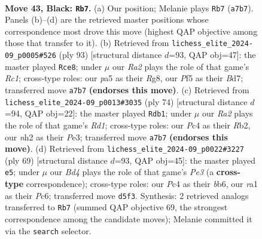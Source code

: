 \documentclass[11pt]{article}
\begin{document}
\clearpage

\begin{figure}[p]\centering
\begin{subfigure}{0.46\textwidth}\centering
\resizebox{\linewidth}{!}{%
\newchessgame
\chessboard[
  setfen={5b1r/r2k2p1/p1p4p/Pp1bBp2/2p4P/4P1P1/1P3P1N/R2K2R1 b - - 3 43},
  showmover=false,
  pgfstyle=straightmove, color=movearrow, markmove={a7-b7}
]}
\caption{}
\end{subfigure}\hfill
\begin{subfigure}{0.46\textwidth}\centering
\resizebox{\linewidth}{!}{%
\newchessgame
\chessboard[
  setfen={2r3r1/2kb1p2/4p1p1/1p1pP2p/pP3P2/P1PR2P1/4B2P/2K1R3 b - - 34 47},
  showmover=false,
  pgfstyle=straightmove, color=movearrow, markmove={c8-e8}
]}
\caption{}
\end{subfigure}
\\[4pt]
\begin{subfigure}{0.46\textwidth}\centering
\resizebox{\linewidth}{!}{%
\newchessgame
\chessboard[
  setfen={3r4/1pr1k2p/p3Bpp1/b2P4/P3p3/4P2P/1R3PP1/3R2K1 w - - 1 38},
  showmover=false,
  pgfstyle=straightmove, color=movearrow, markmove={d1-b1}
]}
\caption{}
\end{subfigure}\hfill
\begin{subfigure}{0.46\textwidth}\centering
\resizebox{\linewidth}{!}{%
\newchessgame
\chessboard[
  setfen={4r1k1/1p3p1p/pBp1p1pb/2P5/3PPP2/6P1/bP1N1K1P/3R4 b - - 1 35},
  showmover=false,
  pgfstyle=straightmove, color=movearrow, markmove={e6-e5}
]}
\caption{}
\end{subfigure}
\caption{\textbf{Move 43, Black: \texttt{Rb7}.} (a) Our position; Melanie plays \texttt{Rb7} (\texttt{a7b7}). Panels (b)--(d) are the retrieved master positions whose correspondence most drove this move (highest QAP objective among those that transfer to it). (b) Retrieved from \texttt{lichess\_elite\_2024-09\_p0005\#526} (ply 93) [structural distance $d$=93, QAP obj=47]: the master played \texttt{Rce8}; under $\mu$ our \emph{Ra2} plays the role of that game's \emph{Rc1}; cross-type roles: our \emph{p}a5 as their \emph{R}g8, our \emph{P}f5 as their \emph{B}d7; transferred move \texttt{a7b7} \textbf{(endorses this move)}. (c) Retrieved from \texttt{lichess\_elite\_2024-09\_p0013\#3035} (ply 74) [structural distance $d$=94, QAP obj=22]: the master played \texttt{Rdb1}; under $\mu$ our \emph{Ra2} plays the role of that game's \emph{Rd1}; cross-type roles: our \emph{P}c4 as their \emph{R}b2, our \emph{n}h2 as their \emph{P}e3; transferred move \texttt{a7b7} \textbf{(endorses this move)}. (d) Retrieved from \texttt{lichess\_elite\_2024-09\_p0022\#3227} (ply 69) [structural distance $d$=93, QAP obj=45]: the master played \texttt{e5}; under $\mu$ our \emph{Bd4} plays the role of that game's \emph{Pe3} (a \textbf{cross-type} correspondence); cross-type roles: our \emph{P}c4 as their \emph{b}b6, our \emph{r}a1 as their \emph{P}c6; transferred move \texttt{d5f3}. Synthesis: 2 retrieved analogs transferred to \texttt{Rb7} (summed QAP objective 69, the strongest correspondence among the candidate moves); Melanie committed it via the \texttt{search} selector.}
\label{fig:thought-m85}
\end{figure}
\end{document}
